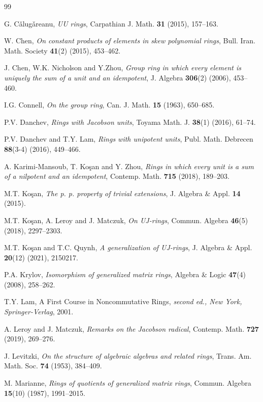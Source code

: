 \documentclass[12pt]{amsart}
\theoremstyle{definition}
\begin{document}
\begin{thebibliography}{99}
	
G. C\v{a}lug\v{a}reanu, {\it UU rings}, Carpathian J. Math. {\bf 31} (2015), 157--163.	
	
W. Chen, {\it On constant products of elements in skew polynomial rings}, Bull. Iran. Math. Society {\bf 41}(2) (2015), 453--462.

J. Chen, W.K. Nicholson and Y.Zhou, {\it Group ring in which every element is uniquely the sum of a unit and an idempotent}, J. Algebra {\bf 306}(2) (2006), 453--460.

I.G. Connell, {\it On the group ring}, Can. J. Math. {\bf 15} (1963), 650--685.

P.V. Danchev, {\it Rings with Jacobson units}, Toyama Math. J. {\bf 38}(1) (2016), 61--74.
	
P.V. Danchev and T.Y. Lam, {\it Rings with unipotent units}, Publ. Math. Debrecen {\bf 88}(3-4) (2016), 449--466.

A. Karimi-Mansoub, T. Ko\c{s}an and Y. Zhou, {\it Rings in which every unit is a sum of a nilpotent and an idempotent}, Contemp. Math. {\bf 715} (2018), 189--203.

M.T. Ko\c{s}an, {\it The p. p. property of trivial extensions}, J. Algebra \& Appl. {\bf 14} (2015).

M.T. Ko\c{s}an, A. Leroy and J. Matczuk, {\it On UJ-rings}, Commun. Algebra {\bf 46}(5) (2018), 2297--2303.

M.T. Ko\c{s}an and T.C. Quynh, {\it A generalization of UJ-rings}, J. Algebra \& Appl. {\bf 20}(12) (2021), 2150217.

P.A. Krylov, {\it Isomorphism of generalized matrix rings}, Algebra \& Logic {\bf 47}(4) (2008), 258--262.

T.Y. Lam, A First Course in Noncommutative Rings, \textit{second ed., New York, Springer-Verlag}, 2001.

A. Leroy and J. Matczuk, {\it Remarks on the Jacobson radical}, Contemp. Math. {\bf 727} (2019), 269--276.

J. Levitzki, {\it On the structure of algebraic algebras and related rings}, Trans. Am. Math. Soc. {\bf 74} (1953), 384--409.

M. Marianne, {\it Rings of quotients of generalized matrix rings}, Commun. Algebra {\bf 15}(10) (1987), 1991--2015.


\end{thebibliography}
\end{document}
